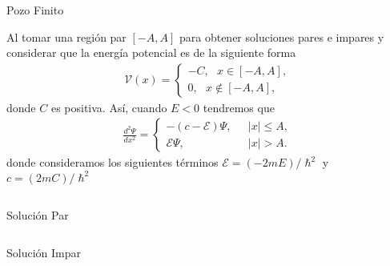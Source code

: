 \documentclass[aspectratio=1610]{beamer}
\begin{document}
\begin{frame}{Pozo Finito}
   
Al tomar una región par $[-A , A]$ para obtener soluciones pares e impares y considerar que la energía potencial es de la siguiente forma  
\begin{align}
        \mathcal{V}(x) = 
        \left\{ \begin{array}{ll}
        -C, \:\:\:  x \in [-A,A],
        \\
        0, \:\:\: x \notin [-A,A],
        \end{array}
        \right.
        \label{eq:PotencialFinito}
\end{align}
donde $C$ es positiva. Así, cuando $E < 0$ tendremos que 
\begin{align}
        \frac{d^2\Psi}{dx^2}= 
        \left\{ \begin{array}{ll}
        -(c-\mathcal{E})\Psi,& \:\:\:  |x| \leq A,
        \\
        \mathcal{E}\Psi,& \:\:\: |x| > A.
        \end{array}
        \right.
        \label{eq:SCsimple}
\end{align}
donde consideramos los siguientes términos $\mathcal{E} = (-2mE)/\hslash^2$ y \\ $c = (2mC)/\hslash^2$
    
\begin{columns}
\column{37em}
\end{columns}
\end{frame}



\begin{frame}{Solución Par}
   
    
\begin{columns}
\column{37em}
\end{columns}
\end{frame}


\begin{frame}{Solución Impar}
   
    
\begin{columns}
\column{37em}
\end{columns}
\end{frame}
\end{document}
